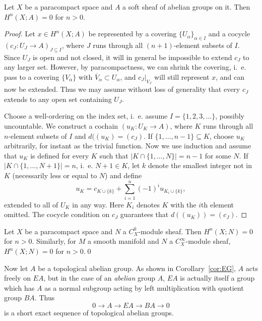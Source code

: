 \documentclass[a4paper,openany]{scrbook}
\begin{document}
\begin{prop}\label{prop:finesheafcohomology}
Let $X$ be a paracompact space and $A$ a soft sheaf of abelian groups on it. Then $H^n(X;A)=0$ for $n>0$.
\end{prop}
\begin{proof}
Let $x \in H^n(X;A)$ be represented by a covering $\{U_\alpha\}_{\alpha \in I}$ and a cocycle $(c_J\colon U_J \to A)_{J \subseteq I}$, where $J$ runs through all $(n+1)$-element subsets of $I$. Since $U_J$ is open and not closed, it will in general be impossible to extend $c_J$ to any larger set. However, by paracompactness, we can shrink the covering, i.~e. pass to a covering $\{V_\alpha\}$ with $\overline V_\alpha \subset U_\alpha$, and $c_J|_{V_J}$ will still represent $x$, and can now be extended. Thus we may assume without loss of generality that every $c_J$ extends to any open set containing $U_J$.

Choose a well-ordering on the index set, i.~e. assume $I=\{1,2,3,\dots\}$, possibly uncountable. We construct a cochain $(u_K\colon U_K \to A)$, where $K$ runs through all $n$-element subsets of $I$ and $d((u_K) = (c_J)$. If $\{1,\dots,n-1\} \subseteq K$, choose $u_K$ arbitrarily, for instant as the trivial function. Now we use induction and assume that $u_K$ is defined for every $K$ such that $|K \cap \{1,\dots,N\}| = n-1$ for some $N$. If $|K \cap \{1,\dots,N+1\}| = n$, i.~e. $N+1 \in K$, let $k$ denote the smallest integer not in $K$ (necessarily less or equal to $N$) and define
\[
u_K = c_{K\cup\{k\}}+\sum_{i=1}^{n} (-1)^i u_{K_i \cup \{k\}},
\]
extended to all of $U_K$ in any way. Here $K_i$ denotes $K$ with the $i$th element omitted. The cocycle condition on $c_J$ guarantees that $d((u_K))=(c_J)$.
\end{proof}


\begin{corollary}\label{cor:Omodulecohomology}
Let $X$ be a paracompact space and $N$ a $C^0_X$-module sheaf. Then $H^n(X;N)=0$ for $n>0$. Similarly, for $M$ a smooth manifold and $N$ a $C^\infty_X$-module sheaf, $H^n(X;N)=0$ for $n>0$.\qed
\end{corollary}


Now let $A$ be a topological abelian group. As shown in Corollary~\ref{cor:EG}, $A$ acts freely on $EA$, but in the case of an \emph{abelian} group $A$, $EA$ is actually itself a group which has $A$ as a normal subgroup acting by left multiplication with quotient group $BA$. Thus
\[
0 \to A \to EA \to BA \to 0
\]
is a short exact sequence of topological abelian groups.
\end{document}
